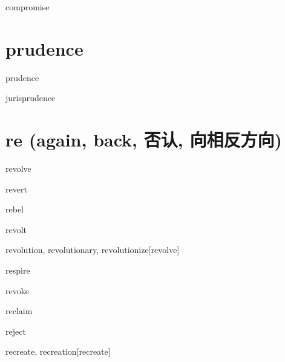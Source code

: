 \begin{RefWord}{compromise}
\end{RefWord}

\section{prudence}

\begin{RefWord}{prudence}
\end{RefWord}

\begin{RefWord}{jurisprudence}
\end{RefWord}

\section{re (again, back, 否认, 向相反方向)}

\begin{RefWord}{revolve}
\end{RefWord}

\begin{RefWord}{revert}
\end{RefWord}

\begin{RefWord}{rebel}
\end{RefWord}

\begin{RefWord}{revolt}
\end{RefWord}

\begin{RefWord}{revolution, revolutionary, revolutionize}[revolve]
\end{RefWord}

\begin{RefWord}{respire}
\end{RefWord}

\begin{RefWord}{revoke}
\end{RefWord}

\begin{RefWord}{reclaim}
\end{RefWord}

\begin{RefWord}{reject}
\end{RefWord}

\begin{RefWord}{recreate, recreation}[recreate]
\end{RefWord}

